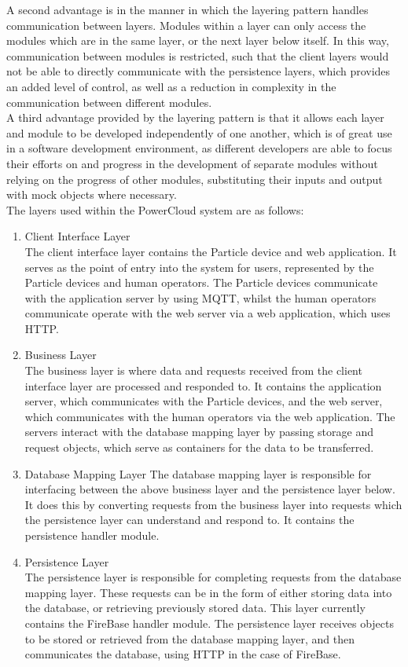 \documentclass{article}
\begin{document}
A second advantage is in the manner in which the layering pattern handles communication between layers. Modules within a layer can only access the modules which are in the same layer, or the next layer below itself. In this way, communication between modules is restricted, such that the client layers would not be able to directly communicate with the persistence layers, which provides an added level of control, as well as a reduction in complexity in the communication between different modules.\\

A third advantage provided by the layering pattern is that it allows each layer and module to be developed independently of one another, which is of great use in a software development environment, as different developers are able to focus their efforts on and progress in the development of separate modules without relying on the progress of other modules, substituting their inputs and output with mock objects where necessary.\\

The layers used within the PowerCloud system are as follows:\\

	\begin{enumerate}
		\item Client Interface Layer\\
		The client interface layer contains the Particle device and web application. It serves as the point of entry into the system for users, represented by the Particle devices and human operators. The Particle devices communicate with the application server by using MQTT, whilst the human operators communicate operate with the web server via a web application, which uses HTTP.
		\item Business Layer\\
		The business layer is where data and requests received from the client interface layer are processed and responded to. It contains the application server, which communicates with the Particle devices, and the web server, which communicates with the human operators via the web application. The servers interact with the database mapping layer by passing storage and request objects, which serve as containers for the data to be transferred.
		\item Database Mapping Layer
		The database mapping layer is responsible for interfacing between the above business layer and the persistence layer below. It does this by converting requests from the business layer into requests which the persistence layer can understand and respond to. It contains the persistence handler module.
		\item Persistence Layer\\
		The persistence layer is responsible for completing requests from the database mapping layer. These requests can be in the form of either storing data into the database, or retrieving previously stored data. This layer currently contains the FireBase handler module. The persistence layer receives objects to be stored or retrieved from the database mapping layer, and then communicates the database, using HTTP in the case of FireBase.
	\end{enumerate}
\end{document}
